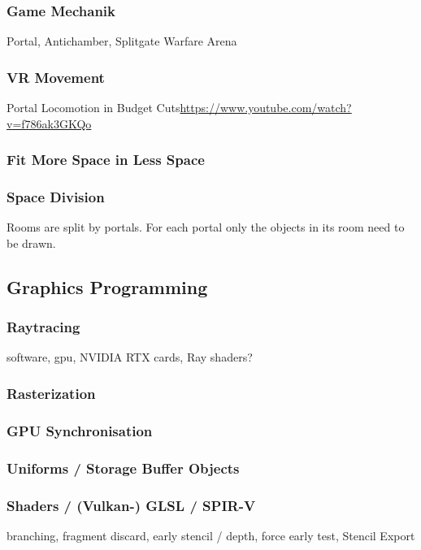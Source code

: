 \subsubsection{Game Mechanik}
Portal, Antichamber, Splitgate Warfare Arena

\subsubsection{VR Movement}

Portal Locomotion in Budget Cuts\url{https://www.youtube.com/watch?v=f786ak3GKQo}

\subsubsection{Fit More Space in Less Space}

\subsubsection{Space Division}
Rooms are split by portals. For each portal only the objects in its room need to be drawn.
\cite{ lowe:2005:technique}

\subsection{Graphics Programming}


\subsubsection{Raytracing}
software,
gpu,
NVIDIA RTX cards, Ray shaders?

\subsubsection{Rasterization}

\subsubsection{GPU Synchronisation}

\subsubsection{Uniforms / Storage Buffer Objects}

\subsubsection{Shaders / (Vulkan-) GLSL / SPIR-V}
branching, fragment discard, early stencil / depth, force early test, Stencil Export


